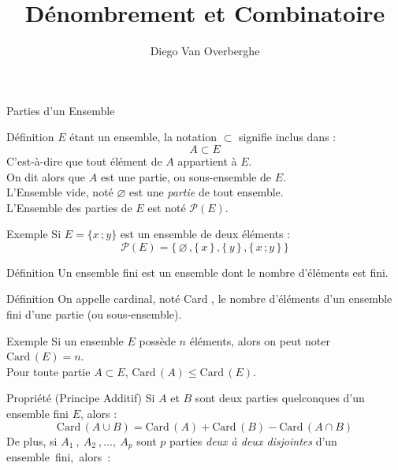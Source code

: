 \documentclass{cours}
\title{Dénombrement et Combinatoire}
\author{Diego Van Overberghe}
\begin{document}

    \begin{Gpartie}{Parties d'un Ensemble}
        \begin{Spartie}{Définition}
            $E$ étant un ensemble, la notation $\subset$ signifie \og inclus dans \fg{} :
            \[A\subset E\]
            C'est-à-dire que tout élément de $A$ appartient à $E$. \\
            On dit alors que $A$ est une partie, ou sous-ensemble de $E$. \\
            L'Ensemble vide, noté $\varnothing$ est une \emph{partie} de tout ensemble. \\
            L'Ensemble des parties de $E$ est noté $\mathcal{P}(E)$.
            \begin{SSpartie}{Exemple}
                Si $E=\big\{x\,;y\big\}$ est un ensemble de deux éléments :
                \[\mathcal{P}(E)=\Big\{\,\varnothing\,, \big\{\, x\,\big\}\,, \big\{\, y\,\big\}\,, \big\{\,x\,; y\,\big\}\,\Big\}\]
            \end{SSpartie}
        \end{Spartie}
        \begin{Spartie}{Définition}
            Un ensemble fini est un ensemble dont le nombre d'éléments est fini.
        \end{Spartie}
        \begin{Spartie}{Définition}
            On appelle cardinal, noté \og Card \fg{}, le nombre d'éléments d'un ensemble fini d'une partie (ou sous-ensemble).
            \begin{SSpartie}{Exemple}
                Si un ensemble $E$ possède $n$ éléments, alors on peut noter $\mathrm{Card}\,(E)=n$. \\
                Pour toute partie $A\subset E$, $\mathrm{Card}\,(A)\leq\mathrm{Card}\,(E)$.
            \end{SSpartie}
        \end{Spartie}
        \begin{Spartie}{Propriété (Principe Additif)}
            Si $A$ et $B$ sont deux parties quelconques d'un ensemble fini $E$, alors :
            \[\mathrm{Card}\,(A\cup B)=\mathrm{Card}\,(A)+\mathrm{Card}\,(B)-\mathrm{Card}\,(A\cap B)\]
            De plus, si $A_1~,~A_2~,\dotsc,~A_p$ sont $p$ parties \emph{deux à deux disjointes} d'un ensemble~fini,~alors~:

\end{Spartie}
\end{Gpartie}
\end{document}

